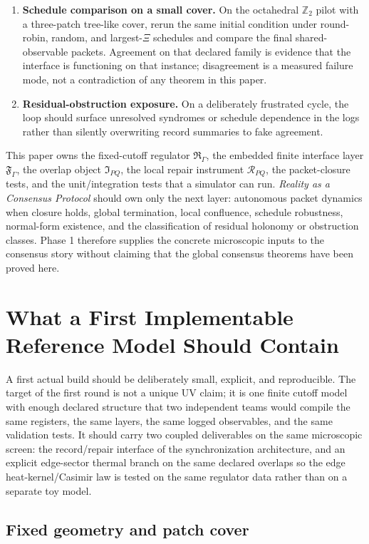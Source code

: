 \documentclass[11pt]{article}
\begin{document}
\begin{enumerate}[leftmargin=2em]
family.
\item \textbf{Schedule comparison on a small cover.}
On the octahedral $\mathbb Z_2$ pilot with a three-patch tree-like cover, rerun the same
initial condition under round-robin, random, and largest-$\Xi$ schedules and compare the final
shared-observable packets. Agreement on that declared family is evidence that the interface is
functioning on that instance; disagreement is a measured failure mode, not a contradiction of
any theorem in this paper.
\item \textbf{Residual-obstruction exposure.}
On a deliberately frustrated cycle, the loop should surface unresolved syndromes or schedule
dependence in the logs rather than silently overwriting record summaries to fake agreement.
\end{enumerate}

This paper owns the fixed-cutoff
regulator $\mathfrak R_{\Gamma}$, the embedded finite interface layer
$\mathfrak F_{\Gamma}$, the overlap object $\mathfrak I_{PQ}$, the local repair instrument
$\mathcal R_{PQ}$, the packet-closure tests, and the unit/integration tests that a simulator can
run. \emph{Reality as a Consensus Protocol} should own only the next layer: autonomous packet dynamics
when closure holds, global termination, local confluence, schedule robustness, normal-form
existence, and the classification of residual holonomy or obstruction classes. Phase 1
therefore supplies the concrete microscopic inputs to the consensus story without claiming that
the global consensus theorems have been proved here.

\section{What a First Implementable Reference Model Should Contain}

A first actual build should be deliberately small, explicit, and reproducible. The target of the
first round is not a unique UV claim; it is one finite cutoff model with enough declared
structure that two independent teams would compile the same registers, the same layers, the same
logged observables, and the same validation tests. It should carry two coupled deliverables
on the same microscopic screen: the record/repair interface of the synchronization
architecture, and an explicit edge-sector thermal branch on the same declared overlaps so the
edge heat-kernel/Casimir law is tested on the same regulator data rather than on a separate toy
model.

\subsection{Fixed geometry and patch cover}
\end{document}
